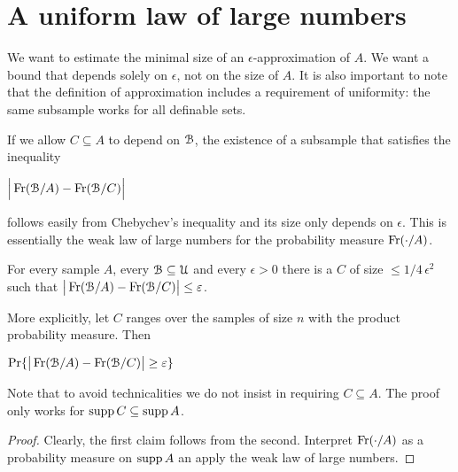 \documentclass[sputnik.tex]{subfiles}
\begin{document}
\section{A uniform law of large numbers}

\def\ceq#1#2#3{\parbox[t]{35ex}{$\displaystyle #1$}\medrel{#2}{$\displaystyle #3$}}

We want to estimate the minimal size of an $\epsilon$-approximation of $A$.
We want a bound that depends solely on $\epsilon$, not on the size of $A$.
It is also important to note that the definition of approximation includes a requirement of uniformity: the same subsample works for all definable sets.

If we allow $C\subseteq A$ to depend on $\EuScript B$, the existence of a subsample that satisfies the inequality 

\ceq{\hfill\displaystyle \Big|\Fr(\B/A) - \Fr(\B/C)\Big|}{\le}{\epsilon}

follows easily from Chebychev's inequality and its size only depends on $\epsilon$. This is essentially the weak law of large numbers for the probability measure $\mathop{\rm Fr}(\cdot/A)$.

\def\ceq#1#2#3{\parbox[t]{35ex}{$\displaystyle #1$}\medrel{#2}{$\displaystyle #3$}}

\begin{proposition}
For every sample $A$, every $\EuScript B\subseteq\EuScript U$ and every $\epsilon>0$ there is a $C$ of size $\le1/4\,\epsilon^2$ such that $\big|\mathop{\rm Fr}(\EuScript B/A) - \mathop{\rm Fr}(\EuScript B/C)\big|\le\varepsilon$.

More explicitly, let $C$ ranges over the samples of size $n$ with the product probability measure. Then 

\ceq{\hfill\Pr\{\big|\Fr(\B/A) - \Fr(\B/C)\big|\ge\epsilon\}}{\le}{\frac1{4n\epsilon^2}}
\end{proposition}
% 
% 
% 

Note that to avoid technicalities we do not insist in requiring $C\subseteq A$. The proof only works for $\mathop{\rm supp} C\subseteq\mathop{\rm supp} A$.

\begin{proof}
Clearly, the first claim follows from the second.
Interpret $\mathop{\rm Fr}(\cdot/A)$ as a probability measure on $\mathop{\rm supp} A$ an apply the weak law of large numbers.
\end{proof}
\end{document}
